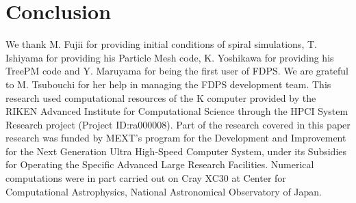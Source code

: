 \documentclass[proof]{pasj01}
\begin{document}




\section{Conclusion}
\label{sec:conclusion}



\bigskip

We thank M. Fujii for providing initial conditions of spiral
simulations, T. Ishiyama for providing his Particle Mesh code,
K. Yoshikawa for providing his TreePM code and Y. Maruyama for being
the first user of FDPS.  We are grateful to M. Tsubouchi for her help
in managing the FDPS development team. This research used
computational resources of the K computer provided by the RIKEN
Advanced Institute for Computational Science through the HPCI System
Research project (Project ID:ra000008). Part of the research covered
in this paper research was funded by MEXT's program for the
Development and Improvement for the Next Generation Ultra High-Speed
Computer System, under its Subsidies for Operating the Specific
Advanced Large Research Facilities. Numerical computations were in
part carried out on Cray XC30 at Center for Computational
Astrophysics, National Astronomical Observatory of Japan.
\end{document}
